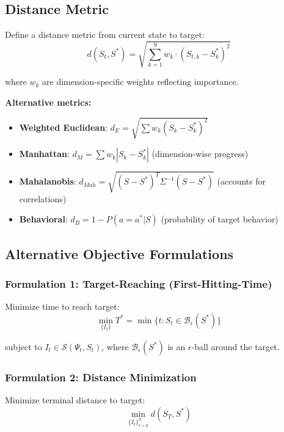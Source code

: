 \subsection{Distance Metric}

Define a distance metric from current state to target:
\begin{equation}
d(S_t, S^*) = \sqrt{\sum_{k=1}^{9} w_k \cdot (S_{t,k} - S^*_k)^2}
\label{eq:mp-distance}
\end{equation}

where $w_k$ are dimension-specific weights reflecting importance.

\textbf{Alternative metrics:}
\begin{itemize}
\item \textbf{Weighted Euclidean}: $d_E = \sqrt{\sum w_k (S_k - S^*_k)^2}$
\item \textbf{Manhattan}: $d_M = \sum w_k |S_k - S^*_k|$ (dimension-wise progress)
\item \textbf{Mahalanobis}: $d_{Mah} = \sqrt{(S-S^*)^T \Sigma^{-1} (S-S^*)}$ (accounts for correlations)
\item \textbf{Behavioral}: $d_B = 1 - P(a = a^* | S)$ (probability of target behavior)
\end{itemize}

\subsection{Alternative Objective Formulations}

\subsubsection{Formulation 1: Target-Reaching (First-Hitting-Time)}

Minimize time to reach target:
\begin{equation}
\boxed{
\min_{\{I_t\}} T^* = \min\{t : S_t \in \mathcal{B}_\epsilon(S^*)\}
}
\label{eq:mp-first-hitting}
\end{equation}

subject to $I_t \in \mathcal{S}(\Psi_t, S_t)$, where $\mathcal{B}_\epsilon(S^*)$ is an $\epsilon$-ball around the target.

\subsubsection{Formulation 2: Distance Minimization}

Minimize terminal distance to target:
\begin{equation}
\boxed{
\min_{\{I_t\}_{t=0}^{T}} d(S_T, S^*)
}
\label{eq:mp-terminal}
\end{equation}

